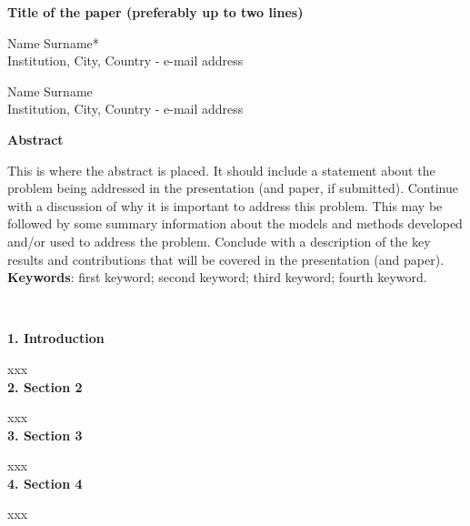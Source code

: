 \documentclass[11pt]{article}
\begin{document}
\templatefigures{}


\small{

\begin{center}
\textbf{Title of the paper (preferably up to two lines)}
\end{center}



\begin{center}
{Name Surname*}\\
{Institution, City, Country - e-mail address}\\ 
\vspace{0.5cm}

{Name Surname}\\
{Institution, City, Country - e-mail address}\\

\end{center}

\begin{center}
{\bf Abstract}
\end{center}

\setlength{\parindent}{0pt}

This is where the abstract is placed. It should include a statement about the problem being addressed in the presentation (and paper, if submitted). Continue with a discussion of why it is important to address this problem. This may be followed by some summary information about the models and methods developed and/or used to address the problem. Conclude with a description of the key results and contributions that will be covered in the presentation (and paper).\\


{\bf Keywords}: first keyword; second keyword; third keyword; fourth keyword.
}\\


\setlength{\parindent}{0pt}

{\bf 1. Introduction}

xxx\\

{\bf 2. Section 2}

xxx\\


{\bf 3. Section 3}

xxx  \\

{\bf 4. Section 4}

xxx\\
\end{document}
